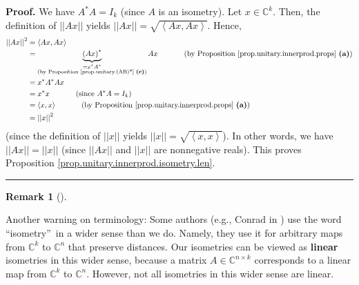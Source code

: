 \documentclass[numbers=enddot,12pt,final,onecolumn,notitlepage]{scrartcl}%
\numberwithin{exer}{subsection}
\theoremstyle{definition}
\newtheorem{remk}[theo]{Remark}
\newenvironment{remark}[1][]
{\begin{remk}[#1]\begin{leftbar}}
{\end{leftbar}\end{remk}}
\newenvironment{proof}[1][Proof]{\noindent\textbf{#1.} }{\ \rule{0.5em}{0.5em}}
\begin{document}
\begin{proof}
We have $A^{\ast}A=I_{k}$ (since $A$ is an isometry). Let $x\in\mathbb{C}^{k}%
$. Then, the definition of $\left\vert \left\vert Ax\right\vert \right\vert $
yields $\left\vert \left\vert Ax\right\vert \right\vert =\sqrt{\left\langle
Ax,Ax\right\rangle }$. Hence,%
\begin{align}
\left\vert \left\vert Ax\right\vert \right\vert ^{2}  &  =\left\langle
Ax,Ax\right\rangle \nonumber\\
&  =\underbrace{\left(  Ax\right)  ^{\ast}}_{\substack{=x^{\ast}A^{\ast
}\\\text{(by Proposition \ref{prop.unitary.(AB)*} \textbf{(c)})}%
}}Ax\ \ \ \ \ \ \ \ \ \ \left(  \text{by Proposition
\ref{prop.unitary.innerprod.props} \textbf{(a)}}\right) \nonumber\\
&  =x^{\ast}A^{\ast}Ax\label{pf.prop.unitary.innerprod.isometry.len.1}\\
&  =x^{\ast}x\ \ \ \ \ \ \ \ \ \ \left(  \text{since }A^{\ast}A=I_{k}\right)
\nonumber\\
&  =\left\langle x,x\right\rangle \ \ \ \ \ \ \ \ \ \ \left(  \text{by
Proposition \ref{prop.unitary.innerprod.props} \textbf{(a)}}\right)
\nonumber\\
&  =\left\vert \left\vert x\right\vert \right\vert ^{2}\nonumber
\end{align}
(since the definition of $\left\vert \left\vert x\right\vert \right\vert $
yields $\left\vert \left\vert x\right\vert \right\vert =\sqrt{\left\langle
x,x\right\rangle }$). In other words, we have $\left\vert \left\vert
Ax\right\vert \right\vert =\left\vert \left\vert x\right\vert \right\vert $
(since $\left\vert \left\vert Ax\right\vert \right\vert $ and $\left\vert
\left\vert x\right\vert \right\vert $ are nonnegative reals). This proves
Proposition \ref{prop.unitary.innerprod.isometry.len}.
\end{proof}

\begin{remark}
Another warning on terminology: Some authors (e.g., Conrad in
\cite[\textquotedblleft Isometries\textquotedblright]{Conrad}) use the word
\textquotedblleft isometry\textquotedblright\ in a wider sense than we do.
Namely, they use it for arbitrary maps from $\mathbb{C}^{k}$ to $\mathbb{C}%
^{n}$ that preserve distances. Our isometries can be viewed as \textbf{linear}
isometries in this wider sense, because a matrix $A\in\mathbb{C}^{n\times k}$
corresponds to a linear map from $\mathbb{C}^{k}$ to $\mathbb{C}^{n}$.
However, not all isometries in this wider sense are linear.
\end{remark}
\end{document}
